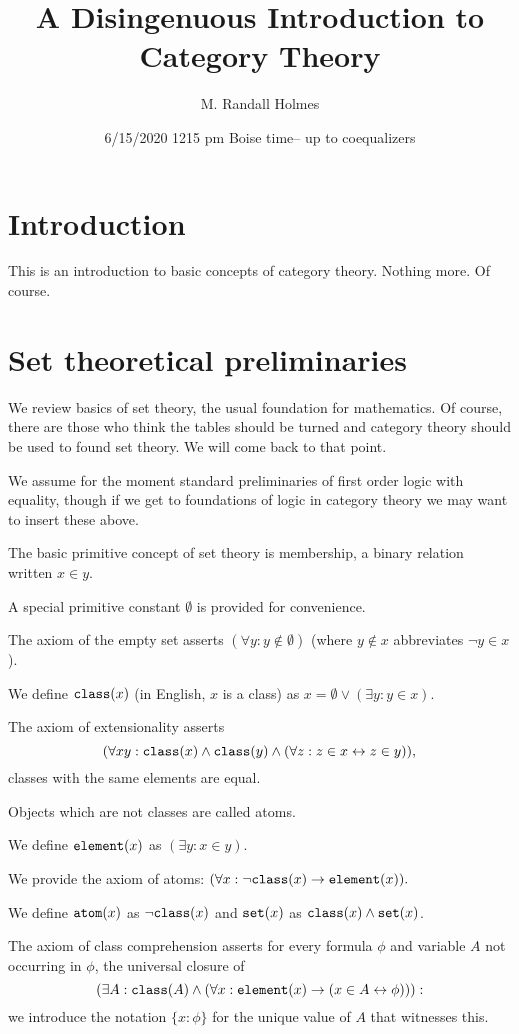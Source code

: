\documentclass[12pt]{article}
\title{A Disingenuous Introduction to Category Theory}
\author{M. Randall Holmes}
\date{6/15/2020  1215 pm Boise time-- up to coequalizers}
\begin{document}
\maketitle

\section{Introduction}

This is an introduction to basic concepts of category theory.  Nothing more.  Of course.

\section{Set theoretical preliminaries}

We review basics of set theory, the usual foundation for mathematics.  Of course, there are those who think the tables should be turned and category theory should be used to found set theory.  We will come back to that point.

We assume for the moment standard preliminaries of first order logic with equality, though if we get to foundations of logic in category theory we may want to insert these above.

The basic primitive concept of set theory is membership, a binary relation written $x \in y$.

A special primitive constant $\emptyset$ is provided for convenience.  

The axiom of the empty set asserts $(\forall y: y \not\in \emptyset)$ (where $y \not\in x$ abbreviates $\neg y \in x$).

We define ${\tt class}(x)$ (in English, $x$ is a class) as $x = \emptyset \vee (\exists y: y \in x)$.

The axiom of extensionality asserts $$(\forall xy: {\tt class}(x) \wedge {\tt class}(y)  \wedge (\forall z:z \in x \leftrightarrow z \in y)),$$ classes with the same elements are equal.

Objects which are not classes are called atoms.

We define ${\tt element}(x)$ as $(\exists y:x \in y)$. 

We provide the axiom of atoms:  $(\forall x:\neg{\tt class}(x) \rightarrow {\tt element}(x)).$

We define ${\tt atom}(x)$ as $\neg{\tt class}(x)$ and ${\tt set}(x)$ as ${\tt class}(x) \wedge {\tt set}(x)$.

The axiom of class comprehension asserts for every formula $\phi$ and variable $A$ not occurring in $\phi$, the universal closure of $$(\exists A: {\tt class}(A) \wedge  (\forall x: {\tt element}(x) \rightarrow (x \in A \leftrightarrow \phi))):$$  we introduce the notation $\{x : \phi\}$ for the unique value of $A$ that witnesses this.
\end{document}
